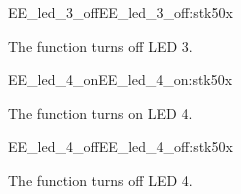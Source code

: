 \begin{function_nopb2}{EE\_led\_3\_off}{EE_led_3_off:stk50x}
  
  \begin{fundescription}
    The function turns off LED 3.
  \end{fundescription}
  
  
  
\end{function_nopb2}

\begin{function_nopb2}{EE\_led\_4\_on}{EE_led_4_on:stk50x}
  
  \begin{fundescription}
    The function turns on LED 4.
  \end{fundescription}
  
  
  
\end{function_nopb2}

\begin{function_nopb2}{EE\_led\_4\_off}{EE_led_4_off:stk50x}
  
  \begin{fundescription}
    The function turns off LED 4.
  \end{fundescription}
  
  
  
\end{function_nopb2}

